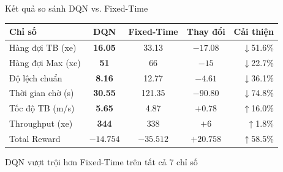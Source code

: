 \begin{frame}{Kết quả so sánh DQN vs. Fixed-Time}
\begin{center}
\begin{tabular}{lcccr}
\toprule
\textbf{Chỉ số} & \textbf{DQN} & \textbf{Fixed-Time} & \textbf{Thay đổi} & \textbf{Cải thiện} \\
\midrule
Hàng đợi TB (xe)    & \textbf{16.05} & 33.13 & $-17.08$ & $\downarrow$51.6\% \\
Hàng đợi Max (xe)   & \textbf{51}    & 66    & $-15$    & $\downarrow$22.7\% \\
Độ lệch chuẩn       & \textbf{8.16}  & 12.77 & $-4.61$  & $\downarrow$36.1\% \\
Thời gian chờ (s)   & \textbf{30.55} & 121.35& $-90.80$ & $\downarrow$74.8\% \\
Tốc độ TB (m/s)     & \textbf{5.65}  & 4.87  & $+0.78$  & $\uparrow$16.0\%  \\
Throughput (xe)     & \textbf{344}   & 338   & $+6$     & $\uparrow$1.8\%   \\
Total Reward        & $\mathbf{-14.754}$ & $-35.512$ & $+20.758$ & $\uparrow$58.5\% \\
\bottomrule
\end{tabular}
\end{center}
\begin{block}{}
\centering DQN vượt trội hơn Fixed-Time trên tất cả 7 chỉ số
\end{block}
\end{frame}

